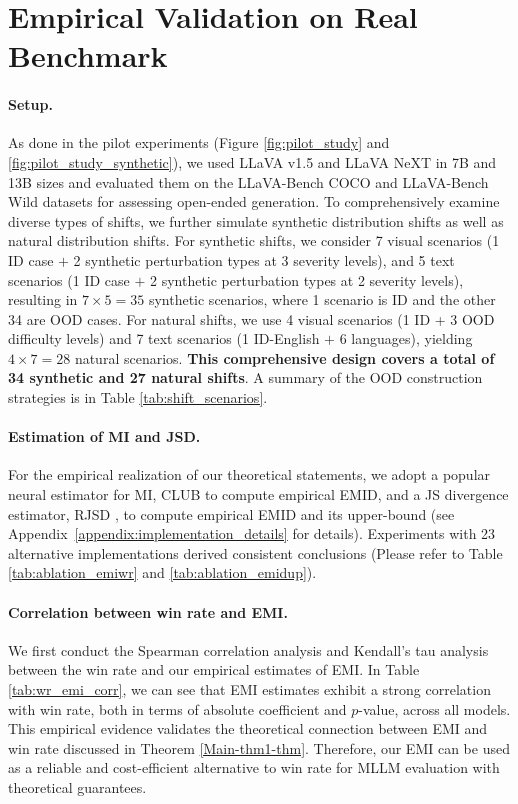 \section{Empirical Validation on Real Benchmark} \label{sec:benchmark}


\paragraph{Setup.} As done in the pilot experiments (Figure \ref{fig:pilot_study} and \ref{fig:pilot_study_synthetic}), we used LLaVA v1.5 \cite{liu2024improved} and LLaVA NeXT \cite{liu2024llavanext} in 7B and 13B sizes and evaluated them on the LLaVA-Bench COCO and LLaVA-Bench Wild \cite{liu2023visual} datasets for assessing open-ended generation. To comprehensively examine diverse types of shifts, we further simulate synthetic distribution shifts as well as natural distribution shifts. For synthetic shifts, we consider 7 visual scenarios (1 ID case $+$ 2 synthetic perturbation types at 3 severity levels), and 5 text scenarios (1 ID case $+$ 2 synthetic perturbation types at 2 severity levels), resulting in $7 \times5 = 35$ synthetic scenarios, where 1 scenario is ID and the other 34 are OOD cases.
For natural shifts, we use 4 visual scenarios (1 ID + 3 OOD difficulty levels) and 7 text scenarios (1 ID-English $+$ 6 languages), yielding $4 \times 7 = 28$ natural scenarios. \textbf{This comprehensive design covers a total of 34 synthetic and 27 natural shifts}.
A summary of the OOD construction strategies is in Table \ref{tab:shift_scenarios}. 


\paragraph{Estimation of MI and JSD.} 
For the empirical realization of our theoretical statements, we adopt a popular neural estimator for MI, CLUB \cite{cheng2020club} to compute empirical EMID, and a JS divergence estimator, RJSD \cite{hoyos2023representation}, to compute empirical EMID and its upper-bound (see Appendix~\ref{appendix:implementation_details} for details). Experiments with 23 alternative implementations derived consistent conclusions (Please refer to Table \ref{tab:ablation_emiwr} and \ref{tab:ablation_emidup}).

\paragraph{Correlation between win rate and EMI.}
We first conduct the Spearman correlation analysis and Kendall's tau analysis between the win rate and our empirical estimates of EMI. In Table \ref{tab:wr_emi_corr}, we can see that EMI estimates exhibit a strong correlation with win rate, both in terms of absolute coefficient and $p$-value, across all models. This empirical evidence validates the theoretical connection between EMI and win rate discussed in Theorem \ref{Main-thm1-thm}. Therefore, our EMI can be used as a reliable and cost-efficient alternative to win rate for MLLM evaluation with theoretical guarantees.


